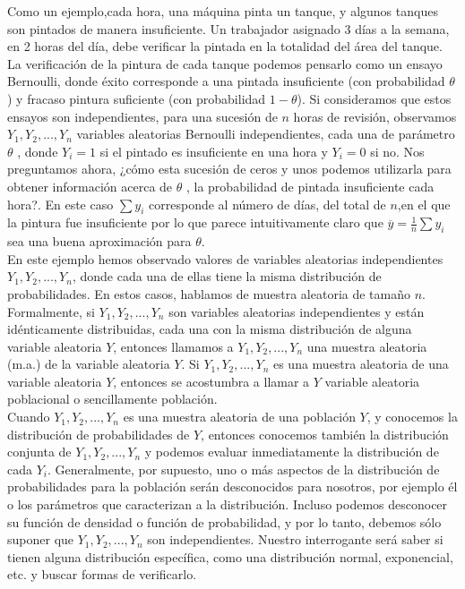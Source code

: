 \documentclass[base=hide,11pt]{elegantbook}
\begin{document}
Como un ejemplo,cada hora, una máquina pinta un tanque, y algunos tanques son pintados de manera insuficiente. Un trabajador asignado 3 días a la semana, en 2 horas del día, debe verificar la pintada en la totalidad del área del tanque. La verificación de la pintura  de cada tanque podemos pensarlo como un ensayo Bernoulli, donde éxito corresponde a una pintada insuficiente (con probabilidad $\theta$)   y fracaso pintura suficiente (con probabilidad $1-\theta$). Si consideramos que estos ensayos son independientes, para una sucesión de $n$ horas de revisión, observamos $Y_{1}, Y_{2},..., Y_{n}$ variables aleatorias Bernoulli independientes, cada una de parámetro $\theta$ , donde $Y_{i} = 1$ si el pintado es insuficiente en una hora y $Y_{i} = 0$ si no. Nos preguntamos ahora, ¿cómo esta sucesión de ceros y unos podemos utilizarla para obtener información acerca de $\theta$ , la probabilidad de pintada insuficiente cada hora?. En este caso  $\sum{y_{i}}$ corresponde al número de días, del total de $n$,en el que la pintura fue insuficiente por lo que parece intuitivamente claro que $\overline{y} = \frac{1}{n}\sum{y_{i}}$ sea una buena aproximación para $\theta$.\\
	
En este ejemplo hemos observado valores de variables aleatorias independientes $Y_{1}, Y_{2},..., Y_{n}$, donde cada una de ellas tiene la misma distribución de probabilidades. En estos casos, hablamos de muestra aleatoria de tamaño $n$. Formalmente,  si $Y_{1}, Y_{2},..., Y_{n}$ son variables aleatorias independientes y están idénticamente distribuidas, cada una con la misma distribución de alguna variable aleatoria $Y$, entonces llamamos a $Y_{1}, Y_{2},..., Y_{n}$ una muestra aleatoria (m.a.) de la variable aleatoria $Y$. Si $Y_{1}, Y_{2},..., Y_{n}$ es una muestra aleatoria de una variable aleatoria $Y$, entonces se acostumbra a llamar a $Y$  variable aleatoria poblacional o sencillamente población.\\
	
Cuando $Y_{1}, Y_{2},..., Y_{n}$ es una muestra aleatoria de una población $Y$, y  conocemos la distribución de probabilidades de $Y$, entonces conocemos también la distribución conjunta de $Y_{1}, Y_{2},..., Y_{n}$ y podemos evaluar inmediatamente la distribución de cada $Y_{i}$. Generalmente, por supuesto, uno o más  aspectos de la distribución de probabilidades para la población serán desconocidos para nosotros, por ejemplo él o los parámetros que caracterizan a la distribución. Incluso podemos desconocer su función de densidad o función de probabilidad, y por lo tanto, debemos sólo suponer que $Y_{1}, Y_{2},..., Y_{n}$ son independientes. Nuestro interrogante será saber si tienen alguna distribución específica, como una distribución normal, exponencial,  etc. y buscar formas de verificarlo.\\
	
\end{document}
